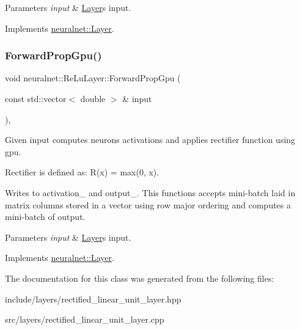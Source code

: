 \begin{DoxyParams}{Parameters}
{\em input} & \hyperlink{classneuralnet_1_1Layer}{Layer}\textquotesingle{}s input. \\
\hline
\end{DoxyParams}


Implements \hyperlink{classneuralnet_1_1Layer_a3aa08517de6a73640cd0e511c134b231}{neuralnet\+::\+Layer}.

\mbox{\label{classneuralnet_1_1ReLuLayer_a97dd16df35d4fb139e955d9a9acc2284}} 
\subsubsection{\texorpdfstring{Forward\+Prop\+Gpu()}{ForwardPropGpu()}}
{\footnotesize\ttfamily void neuralnet\+::\+Re\+Lu\+Layer\+::\+Forward\+Prop\+Gpu (\begin{DoxyParamCaption}\item[{const std\+::vector$<$ double $>$ \&}]{input }\end{DoxyParamCaption})\hspace{0.3cm}{\ttfamily [protected]}, {\ttfamily [virtual]}}



Given input computes neurons\textquotesingle{} activations and applies rectifier function using gpu. 

Rectifier is defined as\+: R(x) = max(0, x).

Writes to activation\+\_\+ and output\+\_\+. This functions accepts mini-\/batch laid in matrix columns stored in a vector using row major ordering and computes a mini-\/batch of output.


\begin{DoxyParams}{Parameters}
{\em input} & \hyperlink{classneuralnet_1_1Layer}{Layer}\textquotesingle{}s input. \\
\hline
\end{DoxyParams}


Implements \hyperlink{classneuralnet_1_1Layer_abd0fdf1146eb28485349337e68ad7982}{neuralnet\+::\+Layer}.



The documentation for this class was generated from the following files\+:\begin{DoxyCompactItemize}
\item 
include/layers/rectified\+\_\+linear\+\_\+unit\+\_\+layer.\+hpp\item 
src/layers/rectified\+\_\+linear\+\_\+unit\+\_\+layer.\+cpp\end{DoxyCompactItemize}
